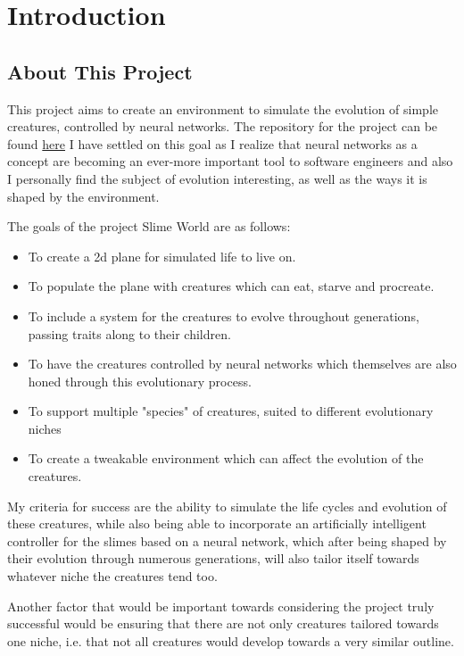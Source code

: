 \chapter{Introduction}
\section{About This Project}
This project aims to create an environment to simulate the evolution of simple creatures, controlled by neural networks. The repository for the project can be found \href{https://github.com/DylanWhelan/ATUFourthYearAppliedProject_2023}{here} I have settled on this goal as I realize that neural networks as a concept are becoming an ever-more important tool to software engineers and also I personally find the subject of evolution interesting, as well as the ways it is shaped by the environment.
\par
The goals of the project Slime World are as follows:
\par
\begin{itemize}
    \item To create a 2d plane for simulated life to live on.
    \item To populate the plane with creatures which can eat, starve and procreate.
    \item To include a system for the creatures to evolve throughout generations, passing traits along to their children.
    \item To have the creatures controlled by neural networks which themselves are also honed through this evolutionary process.
    \item To support multiple "species" of creatures, suited to different evolutionary niches
    \item To create a tweakable environment which can affect the evolution of the creatures.
\end{itemize}
\par
My criteria for success are the ability to simulate the life cycles and evolution of these creatures, while also being able to incorporate an artificially intelligent controller for the slimes based on a neural network, which after being shaped by their evolution through numerous generations, will also tailor itself towards whatever niche the creatures tend too.
\par
Another factor that would be important towards considering the project truly successful would be ensuring that there are not only creatures tailored towards one niche, i.e. that not all creatures would develop towards a very similar outline.
